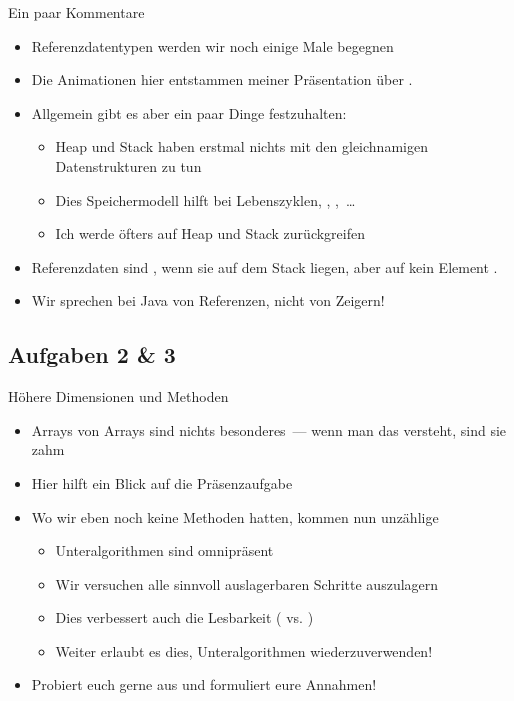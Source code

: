 \begin{frame}{Ein paar Kommentare}
    \begin{itemize}[<+(1)->]
        \itemsep10pt
        \item Referenzdatentypen werden wir noch einige Male begegnen
        \item Die Animationen hier entstammen meiner Präsentation über .
        \item Allgemein gibt es aber ein paar Dinge festzuhalten: \begin{itemize}
            \itemsep1.5pt
            \item Heap und Stack haben erstmal nichts mit den gleichnamigen Datenstrukturen zu tun
            \item Dies Speichermodell hilft bei Lebenszyklen, , \bjava{==},~\ldots
            \item Ich werde öfters auf Heap und Stack zurückgreifen
        \end{itemize}
        \item Referenzdaten sind , wenn sie auf dem Stack liegen, aber auf kein Element .
        \item Wir sprechen bei Java von Referenzen, nicht von Zeigern!
    \end{itemize}
\end{frame}

\subsection{Aufgaben 2 \& 3}
\begin{frame}{Höhere Dimensionen und Methoden}
    \begin{itemize}[<+(1)->]
        \itemsep12pt
        \item Arrays von Arrays sind nichts besonderes~--- wenn man das versteht, sind sie zahm
        \item Hier hilft ein Blick auf die Präsenzaufgabe
        \item Wo wir eben noch keine Methoden hatten, kommen nun unzählige\begin{itemize}
            \item Unteralgorithmen sind omnipräsent
            \item Wir versuchen alle sinnvoll auslagerbaren Schritte auszulagern
            \item Dies verbessert auch die Lesbarkeit ( vs. )
            \item Weiter erlaubt es dies, Unteralgorithmen wiederzuverwenden!
        \end{itemize}
        \item Probiert euch gerne aus und formuliert eure Annahmen!
    \end{itemize}
\end{frame}
\fi

